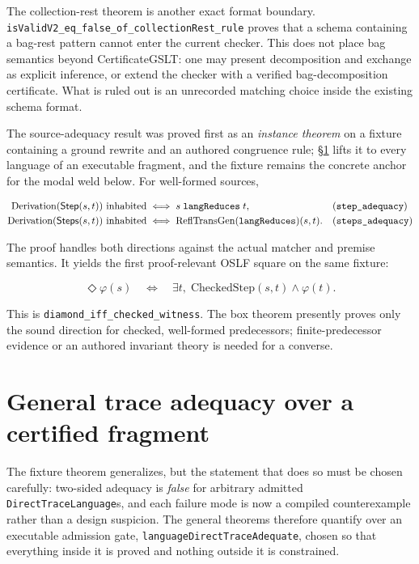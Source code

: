 \documentclass[]{article}
\theoremstyle{remark}
\newcommand{\code}[1]{\texttt{#1}}
\newcommand{\OSLF}{\textup{OSLF}}
\newcommand{\CertificateGSLT}{\textup{CertificateGSLT}}
\begin{document}
The collection-rest theorem is another exact format boundary.
\code{isValidV2\_eq\_false\_of\_collectionRest\_rule} proves that a schema
containing a bag-rest pattern cannot enter the current checker.  This does
not place bag semantics beyond \CertificateGSLT{}: one may present decomposition
and exchange as explicit inference, or extend the checker with a verified
bag-decomposition certificate.  What is ruled out is an unrecorded matching
choice inside the existing schema format.

The source-adequacy result was proved first as an \emph{instance theorem}
on a fixture containing a ground rewrite and an authored congruence rule;
\S\ref{sec:generaladequacy} lifts it to every language of an executable
fragment, and the fixture remains the concrete anchor for the modal weld
below.  For well-formed sources,

\begin{align*}
  \mathrm{Derivation}(\mathsf{Step}(s,t)) \text{ inhabited}
    &\iff s \mathrel{\code{langReduces}} t,
       &&\text{(\code{step\_adequacy})}\\
  \mathrm{Derivation}(\mathsf{Steps}(s,t)) \text{ inhabited}
    &\iff \mathrm{ReflTransGen}(\code{langReduces})(s,t).
       &&\text{(\code{steps\_adequacy})}
\end{align*}

The proof handles both directions against the actual matcher and premise
semantics.  It yields the first proof-relevant \OSLF{} square on the same
fixture:

\[
  \Diamond\varphi(s)
  \quad\Longleftrightarrow\quad
  \exists t,\; \mathrm{CheckedStep}(s,t) \land \varphi(t).
\]

This is \code{diamond\_iff\_checked\_witness}.  The box theorem presently
proves only the sound direction for checked, well-formed predecessors;
finite-predecessor evidence or an authored invariant theory is needed for a
converse.

\section{General trace adequacy over a certified fragment}
\label{sec:generaladequacy}

The fixture theorem generalizes, but the statement that does so must be
chosen carefully: two-sided adequacy is \emph{false} for arbitrary admitted
\code{DirectTraceLanguage}s, and each failure mode is now a compiled
counterexample rather than a design suspicion.  The general theorems
therefore quantify over an executable admission gate,
\code{languageDirectTraceAdequate}, chosen so that everything inside it is
proved and nothing outside it is constrained.
\end{document}
